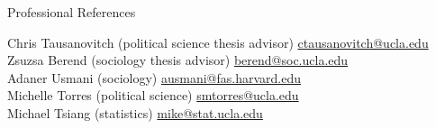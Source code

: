 \documentclass[12pt]{resume} %
\begin{document}
\begin{rSection}{Professional References}

Chris Tausanovitch (political science thesis advisor) \hfill \href{mailto:ctausanovitch@ucla.edu}{ctausanovitch@ucla.edu}\\
Zsuzsa Berend (sociology thesis advisor) \hfill \href{mailto:berend@soc.ucla.edu}{berend@soc.ucla.edu}\\
Adaner Usmani (sociology) \hfill \href{mailto:ausmani@fas.harvard.edu}{ausmani@fas.harvard.edu}\\
Michelle Torres (political science) \hfill \href{mailto:smtorres@ucla.edu}{smtorres@ucla.edu}\\
Michael Tsiang (statistics) \hfill \href{mailto:mike@stat.ucla.edu}{mike@stat.ucla.edu}
\end{rSection}

\end{document}
